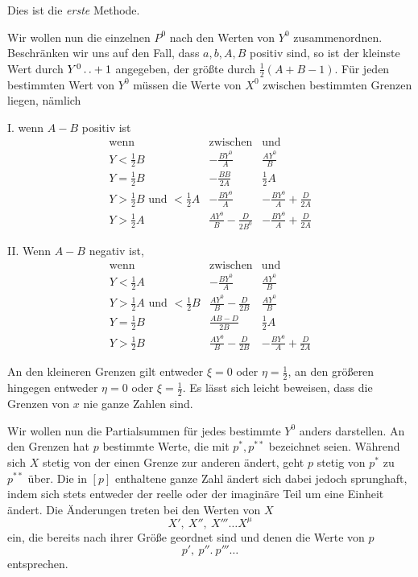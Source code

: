 Dies ist die \emph{erste} Methode.

Wir wollen nun die einzelnen $P^0$ nach den Werten von $Y^0$ zusammenordnen. Beschränken wir uns auf den Fall, dass $a,b,A,B$ positiv sind, so ist der kleinste Wert durch $Y^0\mathinner{.\,.}+1$ angegeben, der größte durch $\frac12(A+B-1)$. Für jeden bestimmten Wert von $Y^0$ müssen die Werte von $X^0$ zwischen bestimmten Grenzen liegen, nämlich

I. wenn $A-B$ positiv ist
\[
\begin{array}{c|c|c}
\text{wenn}&\text{zwischen}&\text{und}\\
Y<\frac12B&-\frac{BY^0}{A}&\frac{AY^0}{B}\\[5pt]
Y=\frac12B&-\frac{BB}{2A}&\frac12A\\[5pt]
Y>\frac12B\text{ und }<\frac12A&-\frac{BY^0}{A}&-\frac{BY^0}{A}+\frac{D}{2A}\\[5pt]
Y>\frac12A&\frac{AY^0}{B}-\frac{D}{2B^0}&-\frac{BY^0}{A}+\frac{D}{2A}
\end{array}
\]

II. Wenn $A-B$ negativ ist,
\[
\begin{array}{c|c|c}
\text{wenn}&\text{zwischen}&\text{und}\\
Y<\frac12A&-\frac{BY^0}{A}&\frac{AY^0}{B}\\[5pt]
Y>\frac12A\text{ und }<\frac12B&\frac{AY^0}{B}-\frac{D}{2B}&\frac{AY^0}{B}\\[5pt]
Y=\frac12B&\frac{AB-D}{2B}&\frac12A\\[5pt]
Y>\frac12B&\frac{AY^0}{B}-\frac{D}{2B}&-\frac{BY^0}{A}+\frac{D}{2A}
\end{array}
\]

An den kleineren Grenzen gilt entweder $\xi=0$ oder $\eta=\frac12$, an den größeren hingegen entweder $\eta=0$ oder $\xi=\frac12$. Es lässt sich leicht beweisen, dass die Grenzen von $x$ nie ganze Zahlen sind.

Wir wollen nun die Partialsummen für jedes bestimmte $Y^0$ anders darstellen. An den Grenzen hat $p$ bestimmte Werte, die mit $p^*,p^{**}$ bezeichnet seien. Während sich $X$ stetig von der einen Grenze zur anderen ändert, geht $p$ stetig von $p^*$ zu $p^{**}$ über. Die in $[p]$ enthaltene ganze Zahl ändert sich dabei jedoch sprunghaft, indem sich stets entweder der reelle oder der imaginäre Teil um eine Einheit ändert. Die Änderungen treten bei den Werten von $X$
\[
X',\ X'',\ X'''\ldots X^\mu
\]
ein, die bereits nach ihrer Größe geordnet sind und denen die Werte von $p$
\[
p',\ p''.\ p'''\ldots
\]
entsprechen.

